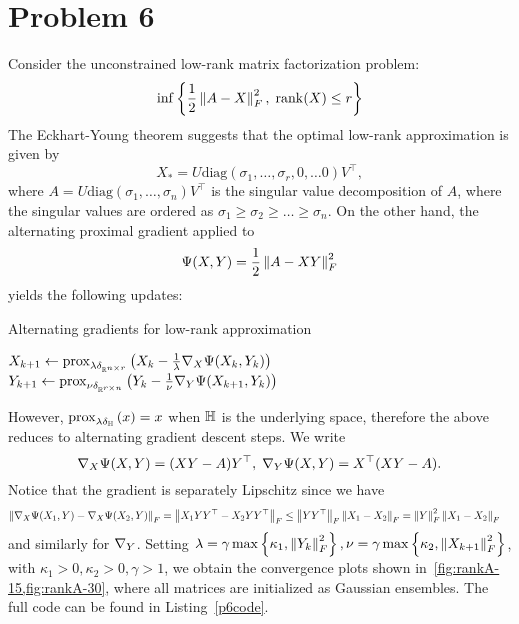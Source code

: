 \documentclass[10pt]{article}
\begin{document}
\section*{Problem 6}
Consider the unconstrained low-rank matrix factorization problem:
\[
    \inf\left\{ \frac{1}{2}\left \| A - X \right \|_F^2, \; \mathrm{rank}(X) \leq r \right\}
\]
The Eckhart-Young theorem suggests that the optimal low-rank approximation is
given by
\[
    X_* = U \mathrm{diag}(\sigma_1, \dots, \sigma_r, 0, \dots 0) V^\top,
\]
where $A = U \mathrm{diag}(\sigma_1, \dots, \sigma_n) V^\top$ is the singular
value
decomposition of $A$, where the singular values are ordered as $\sigma_1 \geq
\sigma_2 \geq \dots \geq \sigma_n$.
On the other hand, the alternating proximal gradient applied to
\[
    \Psi(X, Y) = \frac{1}{2} \left \| A - XY \right \|_F^2
\]
yields the following updates:
\begin{algorithm}
    \caption{Alternating gradients for low-rank approximation}
    \begin{algorithmic}
        \Repeat
            \State $X_{k+1} \gets \mathrm{prox}_{\lambda \delta_{\mathbb{R}^{n \times r}}}\left( 
                X_k - \frac{1}{\lambda} \nabla_X \Psi(X_k, Y_k) \right)$
            \State $Y_{k+1} \gets \mathrm{prox}_{\nu \delta_{\mathbb{R}^{r \times n}}}\left( 
                Y_k - \frac{1}{\nu} \nabla_Y \Psi(X_{k+1}, Y_k) \right)$
    \end{algorithmic}
\end{algorithm}
However, $\mathrm{prox}_{\lambda \delta_{\mathbb{H}}}\left( x \right) = x$ when $\mathbb{H}$ is the underlying
space, therefore the above reduces to alternating gradient descent steps.
We write
\[
    \nabla_X \Psi(X, Y) = (XY - A) Y^\top, \; \nabla_Y \Psi(X, Y) = X^\top (XY -
    A).
\]
Notice that the gradient is separately Lipschitz since we have
\begin{align*}
    \left \| \nabla_{X} \Psi(X_1, Y) - \nabla_X \Psi(X_2, Y) \right \|_F &=
        \left \| X_1 Y Y^\top - X_2 Y Y^\top \right \|_F \leq \left \| YY^\top \right \|_F
        \left \| X_1 - X_2 \right \|_F = \left \| Y \right \|_F^2 \left \| X_1 - X_2 \right \|_F
\end{align*}
and similarly for $\nabla_Y$. Setting $\lambda = \gamma \max\left\{ \kappa_1,
\left \| Y_k \right \|_F^2 \right\}, \nu = \gamma \max\left\{ \kappa_2,
\left \| X_{k+1} \right \|_F^2 \right\}$, with $\kappa_1 > 0, \kappa_2 > 0, \gamma > 1$, we
obtain the convergence plots shown in~\cref{fig:rankA-15,fig:rankA-30}, where
all matrices are initialized as Gaussian ensembles. The full code can be found
in Listing~\ref{p6code}.
\end{document}
